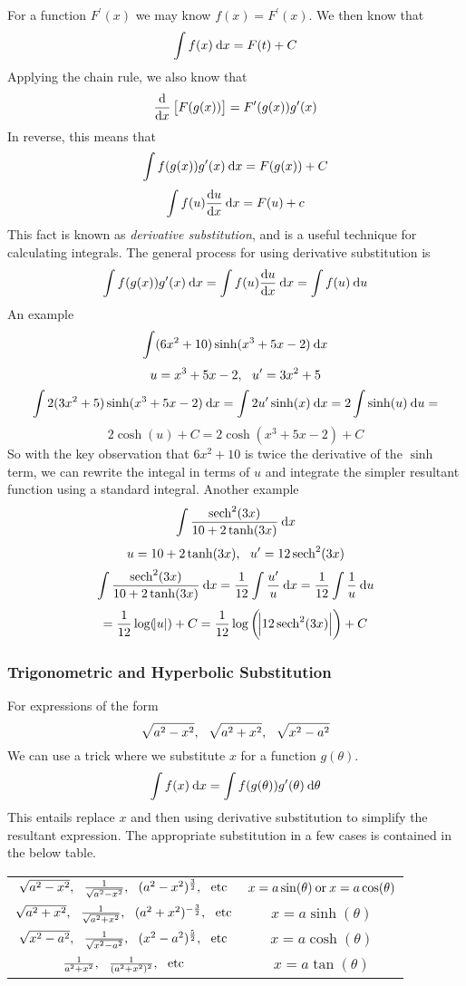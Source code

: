 \documentclass[12pt]{report}
\begin{document}
\begin{flushleft}
For a function \(F^\prime(x)\) we may know \(f(x) = F^\prime(x)\). We then know
that
\[\int f(x) \:\mathrm{d}x = F(t) + C\]
Applying the chain rule, we also know that
\[\frac{\mathrm{d}}{\mathrm{d}x}\left[F(g(x))\right] = F^\prime(g(x))g^\prime(x)\]
In reverse, this means that
\[\int f(g(x))g^\prime(x) \:\mathrm{d}x = F(g(x)) + C\]
\[\int f(u)\frac{\mathrm{d}u}{\mathrm{d}x}\:\mathrm{d}x = F(u) + c\]
This fact is known as \textit{derivative substitution}, and is a useful
technique for calculating integrals. The general process for using derivative
substitution is
\[\int f(g(x))g^\prime(x)\:\mathrm{d}x = \int f(u)\frac{\mathrm{d}u}{\mathrm{d}x}\:\mathrm{d}x 
= \int f(u) \:\mathrm{d}u\]
An example
\[\int (6x^2 + 10)\sinh(x^3 + 5x - 2)\:\mathrm{d}x\]
\[u = x^3 + 5x - 2, \:\:\: u^\prime = 3x^2 + 5\]
\[\int 2(3x^2 + 5)\sinh(x^3 + 5x - 2)\:\mathrm{d}x = \int 2u^\prime\sinh(x)\:\mathrm{d}x
= 2\int\sinh(u) \:\mathrm{d}u = \]
\[2\cosh(u) + C = 2\cosh(x^3 + 5x - 2) + C\]
So with the key observation that \(6x^2 + 10\) is twice the derivative of the
\(\sinh\) term, we can rewrite the integal in terms of \(u\) and integrate the
simpler resultant function using a standard integral. Another example
\[\int\frac{\operatorname{sech}^2(3x)}{10 + 2\tanh(3x)}\:\mathrm{d}x\]
\[u = 10 + 2\tanh(3x), \:\:\: u^\prime = 12\operatorname{sech}^2(3x)\]
\[\int\frac{\operatorname{sech}^2(3x)}{10 + 2\tanh(3x)}\:\mathrm{d}x 
= \frac{1}{12}\int\frac{u^\prime}{u}\:\mathrm{d}x = \frac{1}{12}\int\frac{1}{u}
\:\mathrm{d}u\]
\[= \frac{1}{12}\log(\abs{u}) + C 
= \frac{1}{12}\log\left(\abs{12\operatorname{sech}^2(3x)}\right) + C\]

\subsubsection*{Trigonometric and Hyperbolic Substitution}

For expressions of the form
\[\sqrt{a^2 - x^2}, \:\:\: \sqrt{a^2 + x^2}, \:\:\: \sqrt{x^2 - a^2}\]
We can use a trick where we substitute \(x\) for a function \(g(\theta)\).
\[\int f(x)\:\mathrm{d}x = \int f(g(\theta))g^\prime(\theta) \:\mathrm{d}\theta\]
This entails replace \(x\) and then using derivative substitution to simplify
the resultant expression. The appropriate substitution in a few cases is
contained in the below table.

\renewcommand{\arraystretch}{2}
\begin{center}    
    \begin{tabular}{||c|c||}
        \(\sqrt{a^2 - x^2}, \:\:\: \frac{1}{\sqrt{a^2 - x^2}},
        \:\:\: (a^2 - x^2)^\frac{3}{2}, \:\:\: \mathrm{etc}\) &
        \(x = a\sin(\theta) \:\mathrm{or}\: x = a\cos(\theta)\) \\
        \(\sqrt{a^2 + x^2}, \:\:\: \frac{1}{\sqrt{a^2 + x^2}},
        \:\:\: (a^2 + x^2)^{-\frac{3}{2}}, \:\:\: \mathrm{etc}\) &
        \(x = a\sinh(\theta)\) \\
        \(\sqrt{x^2 - a^2}, \:\:\: \frac{1}{\sqrt{x^2 - a^2}},
        \:\:\: (x^2 - a^2)^\frac{5}{2}, \:\:\: \mathrm{etc}\) &
        \(x = a\cosh(\theta)\) \\
        \(\frac{1}{a^2 + x^2}, \:\:\: \frac{1}{(a^2 + x^2)^2}, \:\:\:
        \mathrm{etc}\) &
        \(x = a\tan(\theta)\) \\
    \end{tabular}
\end{center}
\renewcommand{\arraystretch}{1}


\end{flushleft}
\end{document}
